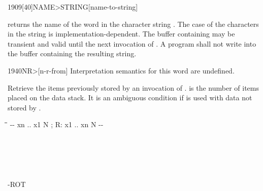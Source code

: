 \vspace*{-6ex}
\begin{worddef}[NAMEtoSTRING]{1909}[40]{NAME>STRING}[name-to-string]%
\item {}

	 returns the name of the word 
	in the character string .  The case of the characters
	in the string is implementation-dependent.  The buffer containing
	 may be transient and valid until the next invocation
	of . A program shall not write into the buffer
	containing the resulting string.

\end{worddef}

\enlargethispage{8ex}\vspace*{-2.5ex}
\begin{worddef}[NRfrom]{1940}{NR>}[n-r-from]%
\interpret
	Interpretation semantics for this word are undefined.

\execute {} 

	Retrieve the items previously stored by an invocation of .
	 is the number of items placed on the data stack. It is an
	ambiguous condition if  is used with data not stored by
	. 


	\begin{implement} %

		\begin{tabbing}
		\tab \= \tab \= \tab[11] \= \kill
		\word{:}   -{}- xn .. x1 N ; R: x1 .. xn N -{}- \\
		  \+ \\
			\word{Rfrom}     \\
			 \+ \\
				 \- \\
			 \+ \\
				\word{Rfrom}    -ROT \\
				 \- \\
			 \\
			 \- \\
		\word{;}
		\end{tabbing}
	\end{implement}
\end{worddef}

